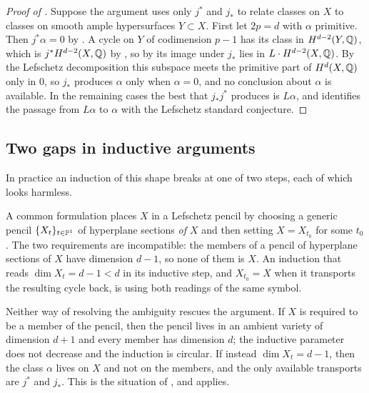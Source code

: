 \begin{proof}[Proof of ]
Suppose the argument uses only $j^{*}$ and $j_{*}$ to relate classes on $X$ to
classes on smooth ample hypersurfaces $Y\subset X$. First let $2p=d$ with
$\alpha$ primitive. Then $j^{*}\alpha=0$ by . A cycle on
$Y$ of codimension $p-1$ has its class in $H^{d-2}(Y,\mathbb{Q})$, which is
$j^{*}H^{d-2}(X,\mathbb{Q})$ by , so by  its
image under $j_{*}$ lies in $L\cdot H^{d-2}(X,\mathbb{Q})$. By the Lefschetz
decomposition this subspace meets the primitive part of $H^{d}(X,\mathbb{Q})$ only
in $0$, so $j_{*}$ produces $\alpha$ only when $\alpha=0$, and no conclusion
about $\alpha$ is available. In the remaining cases the best that
$j_{*}j^{*}$ produces is $L\alpha$, and  identifies the
passage from $L\alpha$ to $\alpha$ with the Lefschetz standard conjecture.
\end{proof}

\subsection{Two gaps in inductive arguments}

In practice an induction of this shape breaks at one of two steps, each of
which looks harmless.

\begin{remark}\label{rem:dimensionbookkeeping}
A common formulation places $X$ in a Lefschetz pencil by choosing a generic
pencil $\{X_{t}\}_{t\in\mathbb{P}^{1}}$ of hyperplane sections \emph{of $X$} and then
setting $X=X_{t_{0}}$ for some $t_{0}$. The two requirements are
incompatible: the members of a pencil of hyperplane sections of $X$ have
dimension $d-1$, so none of them is $X$. An induction that reads
$\dim X_{t}=d-1<d$ in its inductive step, and $X_{t_{0}}=X$ when it transports
the resulting cycle back, is using both readings of the same symbol.

Neither way of resolving the ambiguity rescues the argument. If $X$ is
required to be a member of the pencil, then the pencil lives in an ambient
variety of dimension $d+1$ and every member has dimension $d$; the inductive
parameter does not decrease and the induction is circular. If instead
$\dim X_{t}=d-1$, then the class $\alpha$ lives on $X$ and not on the members,
and the only available transports are $j^{*}$ and $j_{*}$. This is the
situation of , and 
applies.
\end{remark}


